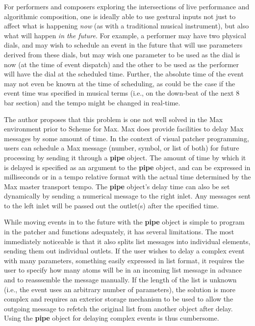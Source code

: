\documentclass[acmsmall]{acmart}
\begin{document}
For performers and composers exploring the intersections of live performance and algorithmic
composition, one is ideally able to use gestural inputs not just to affect
what is happening \textit{now} (as with a traditional musical instrument), but also what will 
happen \textit{in the future}. For example, a performer may have two physical dials,
and may wish to schedule an event in the future that will use parameters derived
from these dials, but may wish one parameter to be used as the dial is now
(at the time of event dispatch) 
and the other to be used as the performer will have the dial at the scheduled time.
Further, the absolute time of the event may not even be known at the time of 
scheduling, as could be the case if the event time was specified in musical terms 
(i.e., on the down-beat of the next 8 bar section) and the tempo might be changed in real-time. 

The author proposes that this problem is one not well solved in the Max environment prior 
to Scheme for Max. Max does provide facilities to delay Max messages by some
amount of time. In the context of visual patcher programming, users can schedule 
a Max message (number, symbol, or list of both) for future processing by sending it through a 
\textbf{pipe} object. The amount of time by which it is delayed is specified as an argument to 
the \textbf{pipe} object, and can be expressed in milliseconds or in a tempo 
relative format with the actual time determined by the Max master transport tempo. 
The \textbf{pipe} object’s delay time can also be set dynamically by sending a numerical message
to the right inlet. Any messages sent to the left inlet will be passed out
the outlet(s) after the specified time. 

While moving events in to the future with the \textbf{pipe} object is simple to program 
in the patcher and functions adequately, 
it has several limitations. The most immediately noticeable is that it also splits 
list messages into individual elements, sending them out individual outlets. 
If the user wishes to delay a complex event with many parameters, something easily 
expressed in list format, it requires the user to specify how many atoms will 
be in an incoming list message in advance and to reasssemble the message manually.
If the length of the list is unknown (i.e., the event uses an arbitrary number
of parameters), the solution is more complex and requires 
an exterior storage mechanism to be used to allow the outgoing 
message to refetch the original list from another object after delay. Using
the \textbf{pipe} object for delaying complex events is thus cumbersome. 
\end{document}
